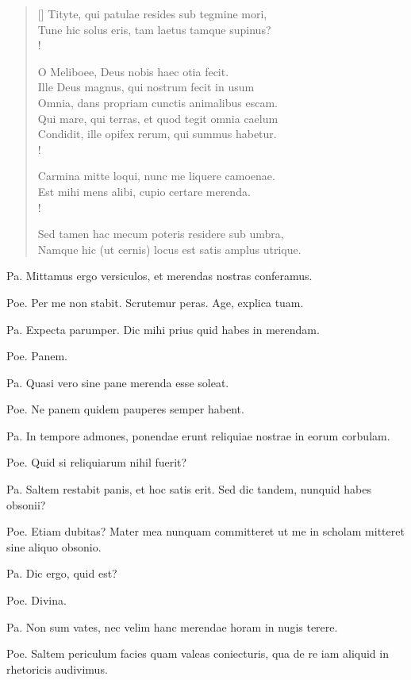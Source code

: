 \documentclass{article}
\begin{document}
\begin{verse}[\versewidth]\settowidth{\versewidth}{Tityte, qui patulae resides sub tegmine mori,}
 Tityte, qui patulae resides sub tegmine mori,\\
Tune hic solus eris, tam laetus tamque supinus?\\!

 O Meliboee, Deus nobis haec otia fecit.\\
Ille Deus magnus, qui nostrum fecit in usum\\ 
Omnia, dans propriam cunctis animalibus escam.\\
Qui mare, qui terras, et quod tegit omnia caelum\\
Condidit, ille opifex rerum, qui summus habetur.\\!

 Carmina mitte loqui, nunc me liquere camoenae.\\
Est mihi mens alibi, cupio certare merenda.\\!

 Sed tamen hac mecum poteris residere sub umbra,\\
Namque hic (ut cernis) locus est satis amplus utrique.\end{verse}
 
Pa. Mittamus ergo versiculos, et merendas nostras conferamus.

Poe. Per me non stabit. Scrutemur peras. Age, explica tuam.

Pa. Expecta parumper. Dic mihi prius quid habes in merendam.

Poe. Panem.

Pa. Quasi vero sine pane merenda esse soleat.

Poe. Ne panem quidem pauperes semper habent.

Pa. In tempore admones, ponendae erunt reliquiae nostrae in eorum corbulam.

Poe. Quid si reliquiarum nihil fuerit?

Pa. Saltem restabit panis, et hoc satis erit. Sed dic tandem, nunquid habes obsonii?

Poe. Etiam dubitas? Mater mea nunquam committeret ut me in scholam mitteret sine aliquo obsonio.

Pa. Dic ergo, quid est?

Poe. Divina.

Pa. Non sum vates, nec velim hanc merendae horam in nugis terere.

Poe. Saltem periculum facies quam valeas coniecturis, qua de re iam aliquid in rhetoricis audivimus.
\end{document}
